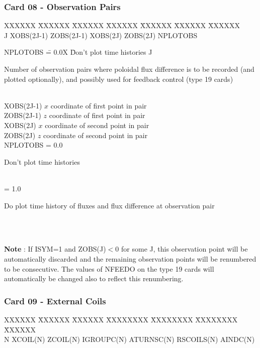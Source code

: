 \newpage \subsubsection{Card 08 - Observation Pairs} 
\begin{tabbing} 
XXXXXX \= XXXXXX \= XXXXXX \= XXXXXX \= XXXXXX \= XXXXXX \=
XXXXXX        \\ 
\footnotesize J \>\footnotesize XOBS(2J-1) \>\footnotesize ZOBS(2J-1) \>\footnotesize XOBS(2J)
\>\footnotesize ZOBS(2J) \>\footnotesize NPLOTOBS 
\end{tabbing}
\begin{tabbing}
NPLOTOBS \= = 0.0X \= Don't plot time histories \kill
J \> \> \parbox[t]{\width}{Number of observation pairs where poloidal flux difference is to be
recorded (and plotted optionally), and possibly used for feedback control (type 19 cards)}\\
XOBS(2J-1) \> \> $x$ coordinate of first point in pair\\
ZOBS(2J-1) \> \>$z$ coordinate of first point in pair\\
XOBS(2J) \> \>$x$ coordinate of second point in pair\\
ZOBS(2J) \> \>$z$ coordinate of second point in pair\\
NPLOTOBS \> = 0.0 \> \parbox[t]{\width}{Don't plot time histories}\\
         \> = 1.0 \> \parbox[t]{\width}{Do plot time history of fluxes and flux difference at
observation pair}\\
\\
\end{tabbing}
{\bf Note} : If ISYM=1 and ZOBS(J)$<$0 for some  J, this observation point will be
automatically discarded and the remaining observation points will be renumbered to be
consecutive. The values of NFEEDO on the type 19 cards will automatically be changed also to
reflect this renumbering.
\pagebreak
\newpage \subsubsection{Card 09 - External Coils}
\begin{tabbing} 
XXXXXX \= XXXXXX \= XXXXXX \= XXXXXXXX \= XXXXXXXX \=
XXXXXXXX \= XXXXXX        \\ 
\footnotesize N \>\footnotesize XCOIL(N) \>\footnotesize ZCOIL(N) \>\footnotesize
IGROUPC(N) \>\footnotesize ATURNSC(N) \>\footnotesize RSCOILS(N) \>\footnotesize
AINDC(N) 
\end{tabbing} 
